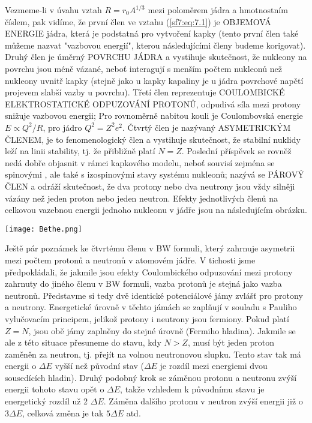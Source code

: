\documentclass[../../main.tex]{subfiles}
\begin{document}
Vezmeme-li v úvahu vztah $R = r_0 A^{1/3}$ mezi poloměrem jádra a hmotnostním číslem, pak vidíme, že první člen ve vztahu (\ref{sf7:eq:7.1}) je OBJEMOVÁ ENERGIE jádra, která je podstatná pro vytvoření kapky (tento první člen také můžeme nazvat "vazbovou energií", kterou následujícími členy budeme korigovat). Druhý člen je úměrný POVRCHU JÁDRA a vystihuje skutečnost, že nukleony na povrchu jsou méně vázané, neboť interagují s menším počtem nukleonů než nukleony uvnitř kapky (stejně jako u kapky kapaliny je u jádra povrchové napětí projevem slabší vazby u povrchu). Třetí člen reprezentuje COULOMBICKÉ ELEKTROSTATICKÉ ODPUZOVÁNÍ PROTONŮ, odpudivá síla mezi protony snižuje vazbovou energii; Pro rovnoměrně nabitou kouli je Coulombovská energie $E \propto Q^2 /R$, pro jádro $Q^2 = Z^2 e^2 $. Čtvrtý člen je nazývaný ASYMETRICKÝM ČLENEM, je to fenomenologický člen a vystihuje skutečnost, že stabilní nuklidy leží na linii stability, tj. že přibližně platí $N = Z$. Poslední příspěvek se rovněž nedá dobře objasnit v rámci kapkového modelu, neboť souvisí zejména se spinovými , ale také s izospinovými stavy systému nukleonů; nazývá se PÁROVÝ ČLEN a odráží skutečnost, že dva protony nebo dva neutrony jsou vždy silněji vázány než jeden proton nebo jeden neutron. Efekty jednotlivých členů na celkovou vazebnou energii jednoho nukleonu v jádře jsou na následujícím obrázku.


\begin{center}
	\texttt{[image: Bethe.png]}
\end{center}

Ještě pár poznámek ke čtvrtému členu v BW formuli, který zahrnuje asymetrii mezi počtem protonů a neutronů v atomovém jádře. V tichosti jsme předpokládali, že jakmile jsou efekty Coulombického odpuzování mezi protony zahrnuty do jiného členu v BW formuli, vazba protonů je stejná jako vazba neutronů. Představme si tedy dvě identické potenciálové jámy zvlášť pro protony a neutrony. Energetické úrovně v těchto jámách se zaplňují v souladu s Pauliho vylučovacím principem, jelikož protony i neutrony jsou fermiony. Pokud platí $Z=N$, jsou obě jámy zaplněny do stejné úrovně (Fermiho hladina). Jakmile se ale z této situace přesuneme do stavu, kdy $N>Z$, musí být jeden proton zaměněn za neutron, tj. přejít na volnou neutronovou slupku. Tento stav tak má energii o $\Delta E$ vyšší než původní stav ($\Delta E$ je rozdíl mezi energiemi dvou sousedících hladin). Druhý podobný krok se záměnou protonu a neutronu zvýší energii tohoto stavu opět o $\Delta E$, takže vzhledem k původnímu stavu je energetický rozdíl už 2 $\Delta E$. Záměna dalšího protonu v neutron zvýší energii již o $3 \Delta E$, celková změna je tak $5 \Delta E$ atd.
\end{document}
